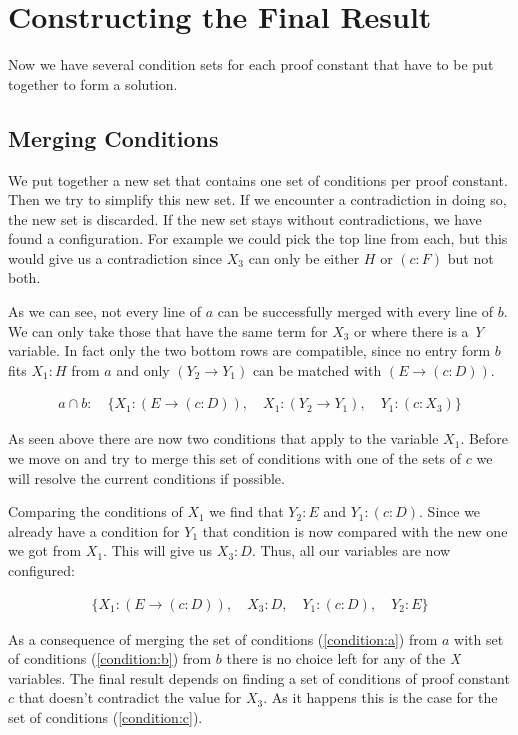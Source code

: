 \section{Constructing the Final Result}
Now we have several condition sets for each proof constant that have to be put together to form a solution.
\subsection{Merging Conditions}
We put together a new set that contains one set of conditions per proof constant. Then we try to simplify this new set. If we encounter a contradiction in doing so, the new set is discarded. If the new set stays without contradictions, we have found a configuration.
For example we could pick the top line from each, but this would give us a contradiction since $X_3$ can only be either $H$ or $(c:F)$ but not both.

As we can see, not every line of $a$ can be successfully merged with every line of $b$. We can only take those that have the same term for $X_3$ or where there is a \emph{Y} variable. In fact only the two bottom rows are compatible, since no entry form $b$ fits $X_1: H$ from $a$ and only $(Y_2 \rightarrow Y_1)$ can be matched with $(E \rightarrow (c:D))$.

\begin{align}
	a \cap b: \quad \{X_1: (E \rightarrow (c:D)), \quad X_1: (Y_2 \rightarrow Y_1), \quad Y_1: (c:X_3)\}
\end{align}

As seen above there are now two conditions that apply to the variable $X_1$. Before we move on and try to merge this set of conditions with one of the sets of $c$ we will resolve the current conditions if possible.

Comparing the conditions of $X_1$ we find that $Y_2: E$ and $Y_1: (c:D)$. Since we already have a condition for $Y_1$ that condition is now compared with the new one we got from $X_1$. This will give us $X_3: D$. Thus, all our variables are now configured:

\begin{align}
	\{X_1: (E \rightarrow (c:D)), \quad X_3: D, \quad Y_1: (c:D), \quad Y_2: E\}
\end{align}

As a consequence of merging the set of conditions (\ref{condition:a}) from $a$ with set of conditions (\ref{condition:b}) from $b$ there is no choice left for any of the \emph{X} variables. The final result depends on finding a set of conditions of proof constant $c$ that doesn't contradict the value for $X_3$. As it happens this is the case for the set of conditions (\ref{condition:c}).


